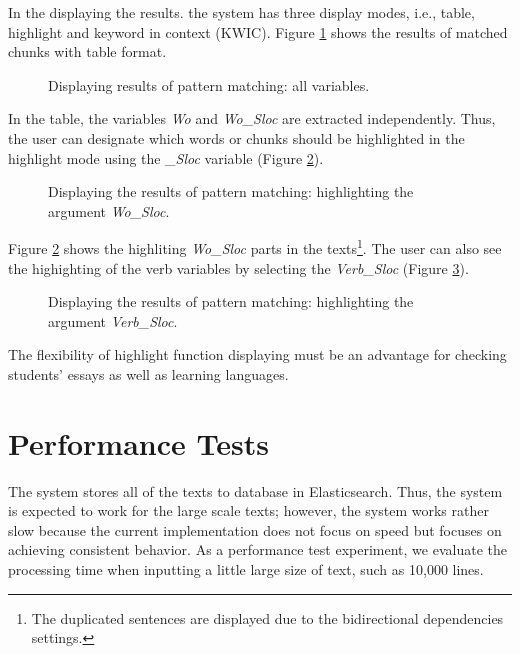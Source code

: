 \documentclass[conference]{IEEEtran}
\begin{document}
In the displaying the results. the system has three display modes, i.e.,
table, highlight and keyword in context (KWIC).
Figure \ref{fig:table} shows the results of matched chunks with table format. 

\begin{figure}[htbp]
\caption{Displaying results of pattern matching: all variables.}
\label{fig:table}
\end{figure}

In the table, the variables {\it Wo} and {\it Wo\_Sloc} are extracted
independently. Thus, the user can designate which words or chunks should be highlighted in
the highlight mode using the {\it \_Sloc} variable (Figure \ref{fig:show1}). 

\begin{figure}[htbp]
\caption{Displaying the results of pattern matching: highlighting the argument {\it Wo\_Sloc}.}
\label{fig:show1}
\end{figure}

Figure \ref{fig:show1} shows the highliting {\it Wo\_Sloc} parts in the texts\footnote{The duplicated
sentences are displayed due to the bidirectional dependencies settings.}.
The user can also see the highighting of the verb variables by selecting the {\it Verb\_Sloc} (Figure \ref{fig:showv}). 

\begin{figure}[htbp]
\caption{Displaying the results of pattern matching: highlighting the argument {\it Verb\_Sloc}.}
\label{fig:showv}
\end{figure}

The flexibility of highlight function displaying must be an advantage for checking students' essays as well as
learning languages. 

\section{Performance Tests}
\label{sec:experiment}
The system stores all of the texts to database in Elasticsearch. Thus,
the system is expected to work for the large scale texts; however, the
system works rather slow because the current implementation does not
focus on speed but focuses on achieving consistent behavior.  As a
performance test experiment, we evaluate the processing time when
inputting a little large size of text, such as 10,000 lines.
\end{document}
